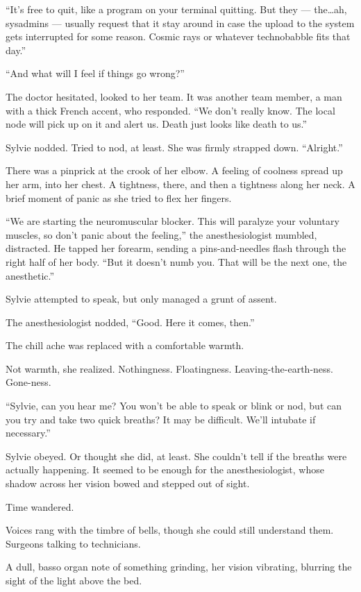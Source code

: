 ``It's free to quit, like a program on your terminal quitting. But they --- the\ldots{}ah, sysadmins --- usually request that it stay around in case the upload to the system gets interrupted for some reason. Cosmic rays or whatever technobabble fits that day.''

``And what will I feel if things go wrong?''

The doctor hesitated, looked to her team. It was another team member, a man with a thick French accent, who responded. ``We don't really know. The local node will pick up on it and alert us. Death just looks like death to us.''

Sylvie nodded. Tried to nod, at least. She was firmly strapped down. ``Alright.''

There was a pinprick at the crook of her elbow. A feeling of coolness spread up her arm, into her chest. A tightness, there, and then a tightness along her neck. A brief moment of panic as she tried to flex her fingers.

``We are starting the neuromuscular blocker. This will paralyze your voluntary muscles, so don't panic about the feeling,'' the anesthesiologist mumbled, distracted. He tapped her forearm, sending a pins-and-needles flash through the right half of her body. ``But it doesn't numb you. That will be the next one, the anesthetic.''

Sylvie attempted to speak, but only managed a grunt of assent.

The anesthesiologist nodded, ``Good. Here it comes, then.''

The chill ache was replaced with a comfortable warmth.

Not warmth, she realized. Nothingness. Floatingness. Leaving-the-earth-ness. Gone-ness.

``Sylvie, can you hear me? You won't be able to speak or blink or nod, but can you try and take two quick breaths? It may be difficult. We'll intubate if necessary.''

Sylvie obeyed. Or thought she did, at least. She couldn't tell if the breaths were actually happening. It seemed to be enough for the anesthesiologist, whose shadow across her vision bowed and stepped out of sight.

Time wandered.

Voices rang with the timbre of bells, though she could still understand them. Surgeons talking to technicians.

A dull, basso organ note of something grinding, her vision vibrating, blurring the sight of the light above the bed.

